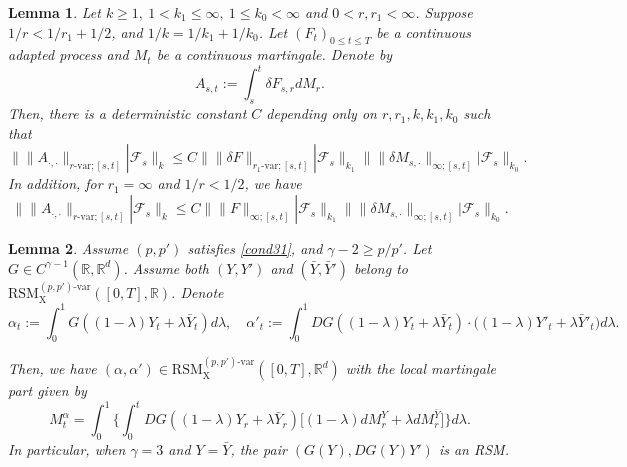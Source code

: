 \documentclass[10pt,a4paper]{amsart}
\newtheorem{lemma}{Lemma}
\def\R{\mathbb R}
\begin{document}
\begin{lemma}\label{lem:p-var martingale estim}
Let $k\ge 1,\ 1<k_1\le \infty,\ 1\le k_{0}<\infty$ and $0<r,r_1 < \infty$. Suppose $1/r < 1/r_1 + 1/2$, and $1/k = 1/k_{1} + 1/k_{0}$. Let $(F_{t})_{0\le t\le T}$ be a continuous adapted process and $M_{t}$ be a continuous martingale. Denote by
\begin{equation*}
A_{s,t} := \int_{s}^{t}\delta F_{s,r} dM_{r}.
\end{equation*}
Then, there is a deterministic constant $C$ depending only on $r,r_1,k,k_1,k_0$ such that 
\begin{equation*}
\big\|\|A_{\bm\cdot,\bm\cdot}\|_{r\text{-}\mathrm{var};[s,t]} | \mathcal F_{s} \big\|_{k} \le C \big\|\|\delta F\|_{r_1\text{-}\mathrm{var};[s,t]} | \mathcal F_{s} \big\|_{k_1} \big\|\|\delta M_{s,\bm\cdot}\|_{\infty;[s,t]} | \mathcal F_{s} \big\|_{k_0}.
\end{equation*}
In addition, for $r_1 = \infty$ and $1/r < 1/2$, we have
\begin{equation*}
\big\|\|A_{\bm\cdot,\bm\cdot}\|_{r\text{-}\mathrm{var};[s,t]} | \mathcal F_{s} \big\|_{k} \le C \big\|\|F\|_{\infty;[s,t]} | \mathcal F_{s}  \big\|_{k_1} \big\|\|\delta M_{s,\bm\cdot}\|_{\infty;[s,t]} | \mathcal F_{s}  \big\|_{k_0}.
\end{equation*}
\end{lemma}

\begin{lemma}\label{lem:int of RSM}
Assume $(p,p')$ satisfies \eqref{cond31}, and $\gamma - 2\ge p/p'$. Let $G \in C^{\gamma - 1}(\R,\R^d)$. Assume both $(Y,Y')$ and $(\bar Y,\bar Y')$ belong to $ \mathrm{RSM}^{(p,p')\text{-}\mathrm{var}}_{\mathrm X}([0,T],\R)$. Denote  
\begin{equation}\label{e:def of alpha}
\alpha_t := \int_{0}^{1}G( (1-\lambda) Y_t + \lambda\bar Y_t) d\lambda,\quad \alpha'_t := \int_{0}^{1} DG( (1-\lambda) Y_t + \lambda\bar Y_t) \cdot \big( (1-\lambda)Y'_{t} + \lambda \bar Y'_{t} \big) d\lambda.
\end{equation}

Then, we have $(\alpha,\alpha') \in \mathrm{RSM}^{(p,p')\text{-}\mathrm{var}}_{\mathrm X}([0,T],\R^d)$ with  the local martingale part given by 
\begin{equation}\label{e:rep of M^alpha}
M^{\alpha}_{t} = \int_{0}^{1} \Big\{\int_{0}^{t} DG( (1-\lambda) Y_r + \lambda\bar Y_r) \big[(1 - \lambda)dM_r^{Y} + \lambda dM^{\bar Y}_r\big] \Big\} d\lambda.
\end{equation}
In particular, when $\gamma = 3$ and $Y=\bar Y$, the pair $(G(Y), D G(Y)Y')$ is an \textrm{RSM}.


\end{lemma}
\end{document}
